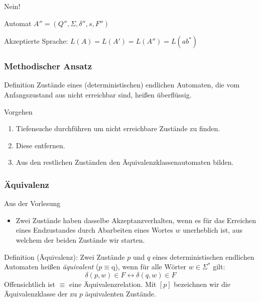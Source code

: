 \documentclass{beamer}
\begin{document}
\begin{frame}
Nein!
\begin{block}{Automat \(A'' = (Q'', \Sigma, \delta'', s, F'')\)}
 \begin{figure}[H]
\begin{center}
\end{center}
\end{figure}
\end{block}
\begin{block}{}
 Akzeptierte Sprache: \(L(A) = L(A') = L(A'') = L(ab^*) \)
\end{block}
\end{frame}
\begin{frame}
 \frametitle{Methodischer Ansatz}
 \begin{block}{Definition}
  Zustände eines (deterministischen) endlichen Automaten, die vom Anfangszustand aus nicht erreichbar sind, heißen überflüssig.
 \end{block}
\begin{block}{Vorgehen}
 \begin{enumerate}
  \item Tiefensuche durchführen um nicht erreichbare Zustände zu finden.
  \item Diese entfernen.
  \item Aus den restlichen Zuständen den Äquivalenzklassenautomaten bilden.
 \end{enumerate}
\end{block}
\end{frame}
\begin{frame}
 \frametitle{Äquivalenz}
 \vspace{-1cm}
 \begin{block}{Aus der Vorlesung}
  \begin{itemize}
   \item Zwei Zustände haben dasselbe Akzeptanzverhalten, wenn es für das Erreichen eines Endzustandes durch Abarbeiten eines Wortes $w$
   unerheblich ist, aus welchem der beiden Zustände wir starten.
  \end{itemize}
 \end{block}
 \begin{block}{Definition (Äquivalenz):}
  Zwei Zustände $p$ und $q$ eines deterministischen endlichen Automaten heißen \emph{äquivalent} ($p \equiv $q),
  wenn für alle Wörter $w\in\Sigma^*$ gilt:
  \[
   \delta(p, w)\in F \leftrightarrow \delta(q, w)\in F
  \]
  Offensichtlich ist $\equiv$ eine Äquivalenzrelation. Mit $[p]$ bezeichnen wir die Äquivalenzklasse der zu $p$ äquivalenten Zustände.
 \end{block}
\end{frame}
\end{document}
